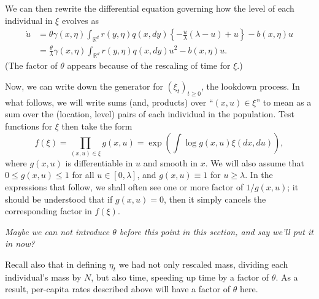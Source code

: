 \documentclass[12pt]{article}
\newcommand{\IR}{\mathbb R}
\newcommand{\lp}{\xi}              %
\newcommand{\comment}[1]{{\color{blue} \it #1}}
\begin{document}
We can then rewrite the differential equation 
governing how the level of each individual
in $\lp$ evolves as
\begin{align}
\dot{u}
    &=
    \theta \gamma(x,\eta) \int_{\IR^d} r(y, \eta) q(x, dy)
    \left\{
        -\frac{u}{\lambda}\left(\lambda - u\right)
        + u
    \right\}
    -
    b(x,\eta) u
    \nonumber \\
    &=
    \frac{\theta}{\lambda} \gamma(x,\eta) \int_{\IR^d} r(y, \eta) q(x, dy) u^2
    -
    b(x, \eta) u
    . \label{differential equation for level}
\end{align}
(The factor of $\theta$ appears because of the rescaling of time for $\lp$.)

Now, we can write down the generator for $(\lp_t)_{t \ge 0}$,
the lookdown process.
In what follows, we will write sums (and, products) over ``$(x, u) \in \xi$''
to mean as a sum over the (location, level) pairs of each individual in the population.
Test functions for $\lp$ then take the form
\begin{equation} \label{eqn:test_functions}
f(\lp)=\prod_{(x,u)\in \lp}g(x,u)=\exp\left(\int \log g(x,u)\lp(dx, du)\right),
\end{equation}
where
$g(x,u)$ is differentiable in $u$ and 
smooth in $x$.
We will also assume that $0\leq g(x,u) \leq 1$ for all $u\in [0,\lambda]$,
and $g(x,u)\equiv 1$ for $u\geq \lambda$.
In the expressions that follow,
we shall often see one or more factor of $1/g(x,u)$;
it should be understood that if $g(x,u)=0$,
then it simply cancels 
the corresponding factor in $f(\lp)$.

\comment{Maybe we can not introduce $\theta$ before this point in this section, and say we'll put it in now?}

Recall also that in defining $\eta_t$
we had not only rescaled mass, dividing each individual's mass by $N$,
but also time, speeding up time by a factor of $\theta$.
As a result, per-capita rates described above will have a factor of $\theta$ here.
\end{document}

